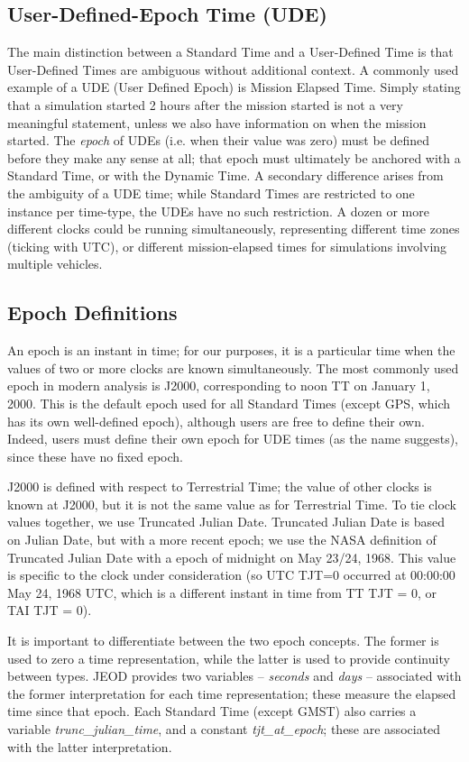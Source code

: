 \subsection{User-Defined-Epoch Time (UDE)}
The main distinction between a Standard Time and a User-Defined Time is
that User-Defined Times are ambiguous without additional context.  A
commonly used example of a UDE (User Defined Epoch) is Mission Elapsed
Time.  Simply stating that a simulation started 2 hours after the
mission started is not a very meaningful statement, unless we also have
information on when the mission started.  The \textit{epoch} of UDEs
(i.e. when their value was zero) must be defined before they make any
sense at all; that epoch must ultimately be anchored with a Standard
Time, or with the Dynamic Time.  A secondary difference arises from the
ambiguity of a UDE time; while Standard Times are restricted to one
instance per time-type, the UDEs have no such restriction.  A dozen or
more different clocks could be running simultaneously, representing
different time zones (ticking with UTC), or different mission-elapsed
times for simulations involving multiple vehicles.

\subsection{Epoch Definitions}
An epoch is an instant in time; for our purposes, it is a particular
time when the values of two or more clocks are known simultaneously. 
The most commonly used epoch in modern analysis is J2000, corresponding
to noon TT on January 1, 2000.  This is the default epoch used for all
Standard Times (except GPS, which has its own well-defined epoch), although users are free to define their own. 
Indeed, users must define their own epoch for UDE times (as the name suggests), 
since these have no fixed epoch.

J2000 is defined with respect to Terrestrial Time; the value of other clocks is known at J2000, but it is not the same value as for Terrestrial Time.  To tie clock values together, we use Truncated Julian Date.  Truncated Julian
Date is based on Julian Date, but with a more recent epoch; we use the
NASA definition of Truncated Julian Date with a epoch of midnight on
May 23/24, 1968.  This value is specific to the clock under consideration (so UTC TJT=0 occurred at 00:00:00 May 24, 1968 UTC, which is a different instant in time from TT TJT = 0, or TAI TJT = 0). 

It is important to differentiate between the two epoch concepts.  The
former is used to zero a time representation, while the latter is used
to provide continuity between types.  JEOD provides two variables --
\textit{seconds} and \textit{days} --  associated with the former
interpretation for each time representation; these measure the elapsed
time since that epoch.  Each Standard Time (except GMST) also carries a variable
\textit{trunc\_julian\_time}, and a constant \textit{tjt\_at\_epoch};
these are associated with the latter interpretation.




